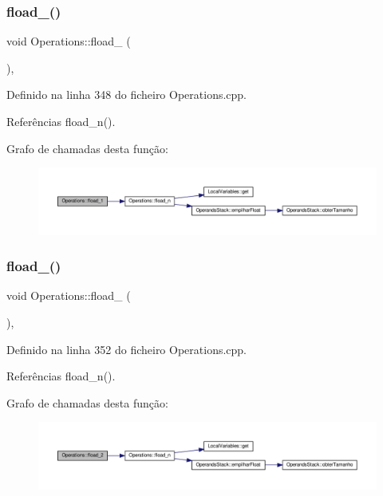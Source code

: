 \subsubsection{\texorpdfstring{fload\+\_()}{fload\_1()}}
{\footnotesize\ttfamily void Operations\+::fload\+\_ (\begin{DoxyParamCaption}{ }\end{DoxyParamCaption})\hspace{0.3cm}{\ttfamily [static]}, {\ttfamily [private]}}



Definido na linha 348 do ficheiro Operations.\+cpp.



Referências fload\+\_\+n().

Grafo de chamadas desta função\+:
\nopagebreak
\begin{figure}[H]
\begin{center}
\leavevmode
\includegraphics[width=350pt]{classOperations_a71611bd9fa43e8e170a35f3a5e1f0572_cgraph}
\end{center}
\end{figure}
\mbox{\label{classOperations_a1d1767084d543ab73c8417efe11e195e}} 
\subsubsection{\texorpdfstring{fload\+\_()}{fload\_2()}}
{\footnotesize\ttfamily void Operations\+::fload\+\_ (\begin{DoxyParamCaption}{ }\end{DoxyParamCaption})\hspace{0.3cm}{\ttfamily [static]}, {\ttfamily [private]}}



Definido na linha 352 do ficheiro Operations.\+cpp.



Referências fload\+\_\+n().

Grafo de chamadas desta função\+:
\nopagebreak
\begin{figure}[H]
\begin{center}
\leavevmode
\includegraphics[width=350pt]{classOperations_a1d1767084d543ab73c8417efe11e195e_cgraph}
\end{center}
\end{figure}
\mbox{\label{classOperations_a1d7d4685fea35e0619ff468ed57a4f94}} 
